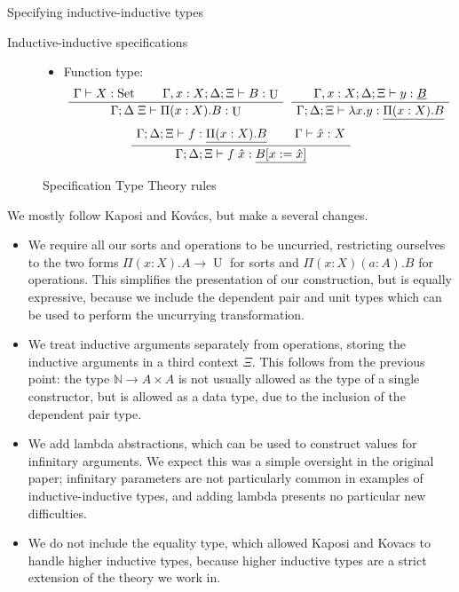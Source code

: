 \documentclass[runningheads]{llncs}
\newenvironment{bprooftree}
  {\leavevmode\hbox\bgroup}
  {\DisplayProof\egroup}
\DeclareMathOperator{\USet}{Set}
\DeclareMathOperator{\UU}{U}
\newcommand{\N}{\mathbb{N}}
\newcommand{\tac}{\vdash}
\begin{document}
{\begin{section}{Specifying inductive-inductive types}
\begin{subsection}{Inductive-inductive specifications}
\begin{figure}[htpb]
\begin{itemize}
\begin{itemize}
            \item Function type:
            \[
                \begin{bprooftree}
                    \AxiomC{$\Gamma \tac X : \USet$}\AxiomC{$\Gamma , x : X ; \Delta ; \Xi \tac B : \UU$}\BinaryInfC{$\Gamma ; \Delta \; \Xi \tac \Pi(x : X).B : \UU$}
                \end{bprooftree}
                \begin{bprooftree}
                    \AxiomC{$\Gamma , x : X ; \Delta ; \Xi \tac y : \underline{B}$}\UnaryInfC{$\Gamma ; \Delta ; \Xi \tac \lambda x.y : \underline{\Pi(x : X).B}$}
                \end{bprooftree}
            \]
            \[
                \begin{bprooftree}
                    \AxiomC{$\Gamma ; \Delta ; \Xi \tac f : \underline{\Pi(x : X).B}$}\AxiomC{$\Gamma \tac \hat{x} : X$}\BinaryInfC{$\Gamma ; \Delta ; \Xi \tac f\; \hat{x} : \underline{B[x := \hat{x}]}$}
                \end{bprooftree}
            \]
    
        \end{itemize}
   
    \end{itemize}
    
    \caption{\label{spec-rules}Specification Type Theory rules}
\end{figure}

We mostly follow Kaposi and Kov\'acs, but make a several changes.
\begin{itemize}
    \item We require all our sorts and operations to be uncurried, restricting ourselves to the two forms $\Pi(x : X).A \to \UU$ for sorts and $\Pi(x : X)(a : A).B$ for operations. This simplifies the presentation of our construction, but is equally expressive, because we include the dependent pair and unit types which can be used to perform the uncurrying transformation.
    \item We treat inductive arguments separately from operations, storing the inductive arguments in a third context $\Xi$. This follows from the previous point: the type $\N \to A \times A$ is not usually allowed as the type of a single constructor, but is allowed as a data type, due to the inclusion of the dependent pair type.
    \item We add lambda abstractions, which can be used to construct values for infinitary arguments. We expect this was a simple oversight in the original paper; infinitary parameters are not particularly common in examples of inductive-inductive types, and adding lambda presents no particular new difficulties.
    \item We do not include the equality type, which allowed Kaposi and Kovacs to handle higher inductive types, because higher inductive types are a strict extension of the theory we work in. \citep{hit_extension_kraus_2018}
\end{itemize}


\end{subsection}
\end{section}}
\end{document}
